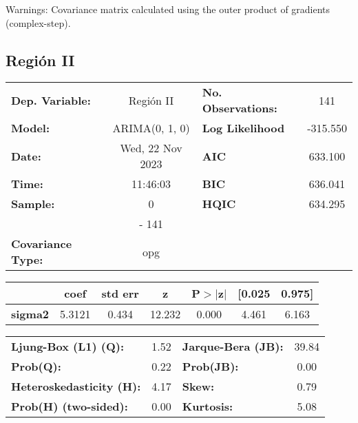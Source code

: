 \documentclass{article}%
\begin{document}
Warnings: \newline
 [1] Covariance matrix calculated using the outer product of gradients (complex-step).%
\subsection*{Región II}%
\begin{center}
\begin{tabular}{lclc}
\toprule
\textbf{Dep. Variable:}          &    Región II     & \textbf{  No. Observations:  } &    141      \\
\textbf{Model:}                  &  ARIMA(0, 1, 0)  & \textbf{  Log Likelihood     } &  -315.550   \\
\textbf{Date:}                   & Wed, 22 Nov 2023 & \textbf{  AIC                } &  633.100    \\
\textbf{Time:}                   &     11:46:03     & \textbf{  BIC                } &  636.041    \\
\textbf{Sample:}                 &        0         & \textbf{  HQIC               } &  634.295    \\
\textbf{}                        &       - 141      & \textbf{                     } &             \\
\textbf{Covariance Type:}        &       opg        & \textbf{                     } &             \\
\bottomrule
\end{tabular}
\begin{tabular}{lcccccc}
                & \textbf{coef} & \textbf{std err} & \textbf{z} & \textbf{P$> |$z$|$} & \textbf{[0.025} & \textbf{0.975]}  \\
\midrule
\textbf{sigma2} &       5.3121  &        0.434     &    12.232  &         0.000        &        4.461    &        6.163     \\
\bottomrule
\end{tabular}
\begin{tabular}{lclc}
\textbf{Ljung-Box (L1) (Q):}     & 1.52 & \textbf{  Jarque-Bera (JB):  } & 39.84  \\
\textbf{Prob(Q):}                & 0.22 & \textbf{  Prob(JB):          } &  0.00  \\
\textbf{Heteroskedasticity (H):} & 4.17 & \textbf{  Skew:              } &  0.79  \\
\textbf{Prob(H) (two-sided):}    & 0.00 & \textbf{  Kurtosis:          } &  5.08  \\
\bottomrule
\end{tabular}
\end{center}
\end{document}
